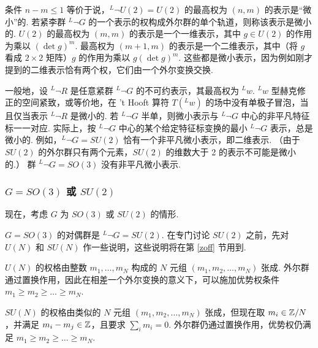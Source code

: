 条件 $n-m\leq 1$ 等价于说，$^L\neg U(2)=U(2)$ 的最高权为 $(n,m)$ 的表示是“微小”的.
若紧李群 $^L\neg G$ 的一个表示的权构成外尔群的单个轨道，则称该表示是微小的.
$U(2)$ 的最高权为 $(m,m)$ 的表示是一个一维表示，其中 $g\in U(2)$ 的作用为乘以 $(\det g)^m$.
最高权为 $(m+1,m)$ 的表示是一个二维表示，其中（将 $g$ 看成 $2\times 2$ 矩阵）$g$ 的作用为乘以 $g(\det g)^m$.
这些都是微小表示，因为例如刚才提到的二维表示恰有两个权，它们由一个外尔变换交换.

一般地，设 $^L\neg R$ 是任意紧群 $^L\neg G$ 的不可约表示，其最高权为 $^Lw$.
$^Lw$ 型赫克修正的空间紧致，或等价地，在 't Hooft 算符 $T(^Lw)$ 的场中没有单极子冒泡，当且仅当表示 $^L\neg R$ 是微小的.
若 $^L\neg G$ 半单，则微小表示与 $^L\neg G$ 中心的非平凡特征标一一对应.
实际上，按 $^L\neg G$ 中心的某个给定特征标变换的最小 $^L\neg G$ 表示，总是微小的.
例如，$^L\neg G=SU(2)$ 恰有一个非平凡微小表示，即二维表示.
（由于 $SU(2)$ 的外尔群只有两个元素，$SU(2)$ 的维数大于 2 的表示不可能是微小的.）
群 $^L\neg G=SO(3)$ 没有非平凡微小表示.

\subsubsection{$G=SO(3)$ 或 $SU(2)$}\label{morz}

现在，考虑 $G$ 为 $SO(3)$ 或 $SU(2)$ 的情形.

$G=SO(3)$ 的对偶群是 $^L\neg G=SU(2)$.
在专门讨论 $SU(2)$ 之前，先对 $U(N)$ 和 $SU(N)$ 作一些说明，这些说明将在第 \ref{zoff} 节用到.

$U(N)$ 的权格由整数 $m_1,\dots, m_N$ 构成的 $N$ 元组 $(m_1,m_2,\dots, m_N)$ 张成.
外尔群通过置换作用，因此在相差一个外尔变换的意义下，可以施加优势权条件 $m_1\geq m_2\geq \dots\geq m_N$.

$SU(N)$ 的权格由类似的 $N$ 元组 $(m_1,m_2,\dots, m_N)$ 张成，但现在取 $m_i\in {\mathbb Z}/N$，并满足 $m_i-m_j\in {\mathbb Z}$，且要求 $\sum_im_i=0$.
外尔群仍通过置换作用，优势权仍满足 $m_1\geq m_2\geq\dots\geq m_N$.

